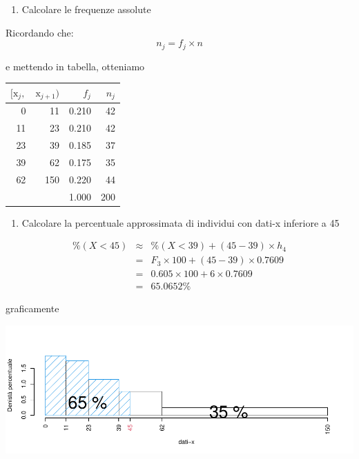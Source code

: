 \documentclass[
  11pt,
]{book}
\providecommand{\tightlist}{%
  \setlength{\itemsep}{0pt}\setlength{\parskip}{0pt}}
\theoremstyle{mytheoremstyle}
\theoremstyle{mydefstyle}
\newenvironment{sol}
  {
  \begin{tcolorbox}[enhanced,breakable,arc=0.1mm,boxrule=1pt,colback=white,colframe=iblue,
  title=\bf \fontfamily{lmss}\selectfont \hspace{.5 cm} Soluzione,drop fuzzy shadow]

}{
\end{tcolorbox}
  }
\begin{document}
\begin{enumerate}
\def\labelenumi{\alph{enumi}.}
\setcounter{enumi}{1}
\tightlist
\item
  Calcolare le frequenze assolute
\end{enumerate}

\begin{sol}

Ricordando che:
\[
n_j=f_j\times n
\]

e mettendo in tabella, otteniamo

\begin{table}[H]
\centering
\begin{tabular}{rrrr}
\toprule
$[\text{x}_j,$ & $\text{x}_{j+1})$ & $f_j$ & $n_j$\\
\midrule
0 & 11 & 0.210 & 42\\
11 & 23 & 0.210 & 42\\
23 & 39 & 0.185 & 37\\
39 & 62 & 0.175 & 35\\
62 & 150 & 0.220 & 44\\
 &  & 1.000 & 200\\
\bottomrule
\end{tabular}
\end{table}

\end{sol}

\begin{enumerate}
\def\labelenumi{\alph{enumi}.}
\setcounter{enumi}{2}
\tightlist
\item
  Calcolare la percentuale approssimata di individui con dati-x inferiore a 45
\end{enumerate}

\begin{sol}

\begin{eqnarray*}
\%(X<45)   &\approx&  \%(X<39)+(45-39)\times h_4\\
&=& F_3\times 100+(45-39)\times 0.7609\\
&=& 0.605\times 100 + 6\times 0.7609\\
&=& 65.0652\%
\end{eqnarray*}

graficamente

\begin{center}\includegraphics{Esami_passati_con_soluzioni_files/figure-latex/01-descr-12-1} \end{center}

\end{sol}
\end{document}
